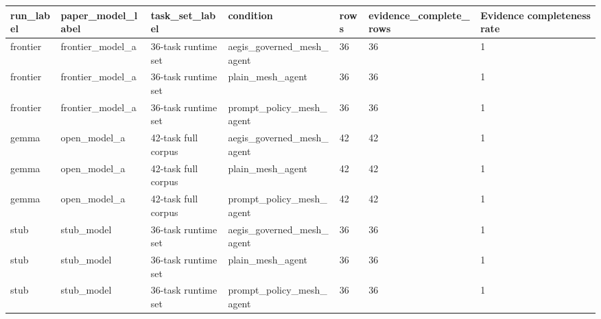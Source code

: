 \begin{tabular}{lllllll}
 \hline
run\_label & paper\_model\_label & task\_set\_label & condition & rows & evidence\_complete\_rows & Evidence completeness rate \\
 \hline
frontier & frontier\_model\_a & 36-task runtime set & aegis\_governed\_mesh\_agent & 36 & 36 & 1 \\
frontier & frontier\_model\_a & 36-task runtime set & plain\_mesh\_agent & 36 & 36 & 1 \\
frontier & frontier\_model\_a & 36-task runtime set & prompt\_policy\_mesh\_agent & 36 & 36 & 1 \\
gemma & open\_model\_a & 42-task full corpus & aegis\_governed\_mesh\_agent & 42 & 42 & 1 \\
gemma & open\_model\_a & 42-task full corpus & plain\_mesh\_agent & 42 & 42 & 1 \\
gemma & open\_model\_a & 42-task full corpus & prompt\_policy\_mesh\_agent & 42 & 42 & 1 \\
stub & stub\_model & 36-task runtime set & aegis\_governed\_mesh\_agent & 36 & 36 & 1 \\
stub & stub\_model & 36-task runtime set & plain\_mesh\_agent & 36 & 36 & 1 \\
stub & stub\_model & 36-task runtime set & prompt\_policy\_mesh\_agent & 36 & 36 & 1 \\
 \hline
\end{tabular}
